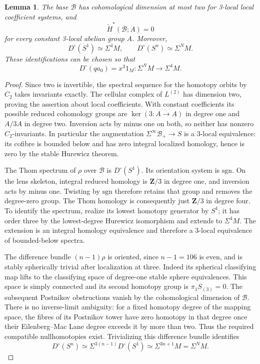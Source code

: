 \documentclass[11pt]{article}
\newtheorem{lemma}[theorem]{Lemma}
\theoremstyle{definition}
\theoremstyle{remark}
\numberwithin{equation}{section}
\begin{document}
\begin{lemma}\label{cube:lens-thom}
The base \(\mathcal B\) has cohomological dimension at most two
for 3-local local coefficient systems, and
\[
 \widetilde H^*(\mathcal B;A)=0
\]
for every constant 3-local abelian group \(A\).
Moreover,
\begin{equation}\label{cube:thom-identifications}
 D^\circ(S^1)\simeq\Sigma^4M,\qquad
 D^\circ(S^n)\simeq\Sigma^NM.
\end{equation}
These identifications can be chosen so that
\begin{equation}\label{cube:quotient-cube}
 D^\circ(qa_0)=x^3 1_M:
       \Sigma^NM\longrightarrow\Sigma^4M.
\end{equation}
\end{lemma}

\begin{proof}
Since two is invertible, the spectral sequence for the homotopy
orbits by \(C_2\) takes invariants exactly.  The cellular complex
of \(L^{(2)}\) has dimension two, proving the assertion about
local coefficients.  With constant coefficients its possible
reduced cohomology groups are
\(\ker(3:A\to A)\) in degree one and \(A/3A\) in degree two.
Inversion acts by minus one on both, so neither has nonzero
\(C_2\)-invariants.  In particular the augmentation
\(\Sigma^\infty\mathcal B_+\to S\) is a 3-local equivalence:
its cofibre is bounded below and has zero integral localized
homology, hence is zero by the stable Hurewicz theorem.

The Thom spectrum of \(\rho\) over \(\mathcal B\) is
\(D^\circ(S^1)\).  Its orientation system is \(\mathrm{sgn}\).
On the lens skeleton, integral reduced homology is
\(\mathbf Z/3\) in degree one, and inversion acts by minus one.
Twisting by \(\mathrm{sgn}\) therefore retains that group
and removes the degree-zero group.  The Thom homology is
consequently just \(\mathbf Z/3\) in degree four.
To identify the spectrum, realize its lowest homotopy generator
by \(S^4\); it has order three by the lowest-degree Hurewicz
isomorphism and extends to \(\Sigma^4M\).
The extension is an integral homology equivalence and therefore
a 3-local equivalence of bounded-below spectra.

The difference bundle \((n-1)\rho\) is oriented, since \(n-1=106\)
is even, and is stably spherically trivial after localization at
three.  Indeed its spherical classifying map lifts to the
classifying space of degree-one stable sphere equivalences.
This space is simply connected and its second homotopy group
is \(\pi_1S_{(3)}=0\).  The subsequent Postnikov obstructions
vanish by the cohomological dimension of \(\mathcal B\).
There is no inverse-limit ambiguity: for a fixed homotopy
degree of the mapping space, the fibres of its Postnikov
tower have zero homotopy in that degree once their
Eilenberg--Mac Lane degree exceeds it by more than two.
Thus the required compatible nullhomotopies exist.
Trivializing this difference bundle identifies
\[
 D^\circ(S^n)\simeq
 \Sigma^{3(n-1)}D^\circ(S^1)
 \simeq\Sigma^{3n+1}M=\Sigma^NM.
\]


\end{proof}
\end{document}
